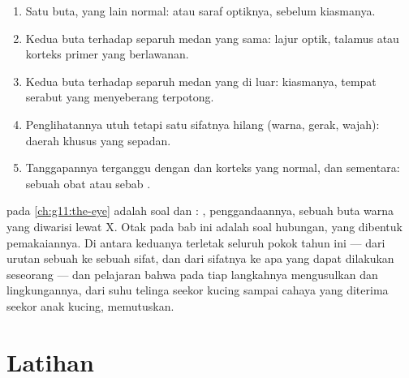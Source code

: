 \begin{method}\label{met:g11:vision-and-brain:locate}
\begin{enumerate}
  \item Satu  buta,  yang lain normal:  atau saraf
        optiknya, sebelum kiasmanya.
  \item Kedua  buta terhadap separuh medan yang sama: lajur
        optik, talamus atau korteks primer yang berlawanan.
  \item Kedua  buta terhadap separuh medan yang di luar:
        kiasmanya, tempat serabut yang menyeberang terpotong.
  \item Penglihatannya utuh tetapi satu sifatnya hilang (warna, gerak,
        wajah): daerah khusus yang sepadan.
  \item Tanggapannya terganggu dengan  dan korteks yang normal, dan
        sementara: sebuah obat atau sebab .
\end{enumerate}
\end{method}

\begin{remark}\label{rem:g11:vision-and-brain:year}
 pada \cref{ch:g11:the-eye} adalah soal  dan : ,
penggandaannya, sebuah buta warna yang diwarisi lewat  X. Otak
pada bab ini adalah soal hubungan, yang dibentuk pemakaiannya. Di
antara keduanya terletak seluruh pokok tahun ini --- dari urutan sebuah
 ke sebuah sifat, dan dari sifatnya ke apa yang dapat dilakukan
seseorang --- dan pelajaran bahwa pada tiap langkahnya 
mengusulkan dan lingkungannya, dari suhu telinga seekor kucing sampai
cahaya yang diterima  seekor anak kucing, memutuskan.
\end{remark}

\section{Latihan}

